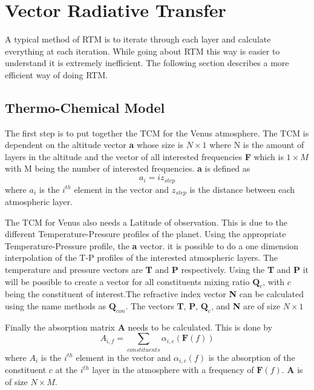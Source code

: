 \section{Vector Radiative Transfer}
A typical method of RTM is to iterate through each layer and calculate everything at each iteration. While going about RTM this way is easier to understand it is extremely inefficient. The following section describes a more efficient way of doing RTM.
\subsection{Thermo-Chemical Model}
The first step is to put together the TCM for the Venus atmosphere. The TCM is dependent on the altitude vector \textbf{a} whose size is $N\times 1$ where N is the amount of layers in the altitude and the vector of all interested frequencies \textbf{F} which is $1 \times M$ with M being the number of interested frequencies. \textbf{a} is defined as
\begin{equation}
a_i = iz_{step}
\end{equation}
where $a_i$ is the $i^{th}$ element in the vector and $z_{step}$ is the distance between each atmospheric layer. 

The TCM for Venus also needs a Latitude of observation. This is due to the different Temperature-Pressure profiles of the planet. Using the appropriate Temperature-Pressure profile, the \textbf{a} vector. it is possible to do a one dimension interpolation of the T-P profiles of the interested atmospheric layers. The temperature and pressure vectors are \textbf{T} and \textbf{P} respectively. Using the \textbf{T} and \textbf{P} it will be possible to create a vector for all constituents mixing ratio $\textbf{Q}_{c}$, with $c$ being the constituent of interest.The refractive index vector \textbf{N} can be calculated using the name methods as $\textbf{Q}_{con}$. The vectors \textbf{T}, \textbf{P}, $\textbf{Q}_{c}$, and \textbf{N} are of size $N\times 1$


Finally the absorption matrix \textbf{A} needs to be calculated. This is done by
\begin{equation}
A_{i,f} = \sum_{constituents} \alpha_{i,c}(\textbf{F}(f))
\end{equation}
where $A_i$ is the $i^{th}$ element in the vector and $\alpha_{i,c}(f)$ is the absorption of the constituent $c$ at the $i^{th}$ layer in the atmosphere with a frequency of $\textbf{F}(f)$. \textbf{A} is of size $N \times M$.

